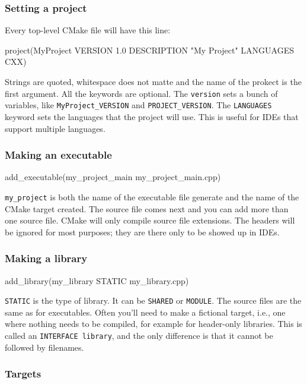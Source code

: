 \subsubsection{Setting a project}
Every top-level CMake file will have this line:
\begin{codeblock}[language=C++]
project(MyProject VERSION 1.0
    DESCRIPTION "My Project"
    LANGUAGES CXX)
\end{codeblock}

Strings are quoted, whitespace does not matte and the name of the prokect is the first argument.
All the keywords are optional. The \texttt{version} sets a bunch of variables, like \texttt{MyProject\_VERSION} 
and \texttt{PROJECT\_VERSION}. The \texttt{LANGUAGES} keyword sets the languages that the project will use. This is useful for IDEs that support multiple languages.

\subsubsection{Making an executable}

\begin{codeblock}[language=C++]
add_executable(my_project_main my_project_main.cpp)
\end{codeblock}

\texttt{my\_project} is both the name of the executable file generate and the name of the CMake target created.
The source file comes next and you can add more than one source file. CMake will only compile source file extensions. 
The headers will be ignored for most purposes; they are there only to be showed up in IDEs.

\subsubsection{Making a library}

\begin{codeblock}[language=C++]
add_library(my_library STATIC my_library.cpp)
\end{codeblock}

\texttt{STATIC} is the type of library. It can be \texttt{SHARED} or \texttt{MODULE}. The source files are the same as for executables.
Often you'll need to make a fictional target, i.e., one where nothing needs to be compiled, for example for header-only libraries. This is called an \texttt{INTERFACE library},
and the only difference is that it cannot be followed by filenames.

\subsubsection{Targets}

